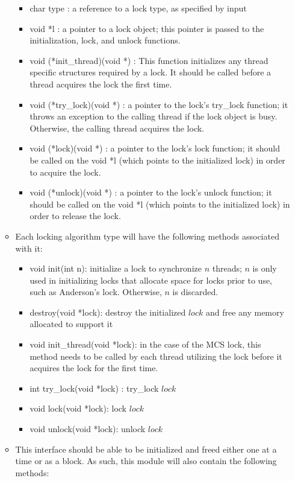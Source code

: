 \documentclass[]{article}
\begin{document}
\begin{itemize}
\begin{itemize}
		\begin{itemize}
			\item char type : a reference to a lock type, as specified by input
			\item void *l : a pointer to a lock object; this pointer is passed to the initialization, lock, and unlock functions.	
			\item void (*init\_thread)(void *) : This function initializes any thread specific structures required by a lock. It should be called before a thread acquires the lock the first time.	
			\item void (*try\_lock)(void *) : a pointer to the lock's try\_lock function; it throws an exception to the calling thread if the lock object is busy. Otherwise, the calling thread acquires the lock.
			\item void (*lock)(void *) : a pointer to the lock's lock function; it should be called on the void *l (which points to the initialized lock) in order to acquire the lock. 	
			\item void (*unlock)(void *) : a pointer to the lock's unlock function; it should be called on the void *l (which points to the initialized lock) in order to release the lock. 
		\end{itemize}
		\item Each locking algorithm type will have the following methods associated with it:
		\begin{itemize}
			\item void init(int n):  initialize a lock to synchronize $n$ threads; $n$ is only used in initializing locks that allocate space for locks prior to use, such as Anderson's lock. Otherwise, $n$ is discarded.
			\item destroy(void *lock): destroy the initialized $lock$ and free any memory allocated to support it
			\item void init\_thread(void *lock): in the case of the MCS lock, this method needs to be called by each thread utilizing the lock before it acquires the lock for the first time.
			\item int try\_lock(void *lock) : try\_lock $lock$
			\item void lock(void *lock): lock $lock$
			\item void unlock(void *lock): unlock $lock$
		\end{itemize}
		\item This interface should be able to be initialized and freed either one at a time or as a block. As such, this module will also contain the following methods:

\end{itemize}
\end{itemize}
\end{document}
